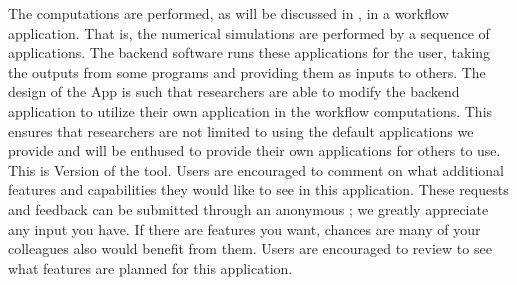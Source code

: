The computations are performed, as will be discussed in , in a workflow application. That is, the numerical simulations are performed by a sequence of applications. The \textttt{\getsoftwarename{}} backend software runs these applications for the user, taking the outputs from some programs and providing them as inputs to others. The design of the \textttt{\getsoftwarename{}} App is such that researchers are able to modify the backend application to utilize their own application in the workflow computations. This ensures that researchers are not limited to using the default applications we provide and will be enthused to provide their own applications for others to use.\\

This is Version \getsoftwareversion{} of the tool. Users are
encouraged to comment on what additional features and capabilities
they would like to see in this application. These requests and
feedback can be submitted through an anonymous ; we greatly appreciate any input you have. If there are
features you want, chances are many of your colleagues also would
benefit from them. Users are encouraged to review
 to see what features are planned for this
application.